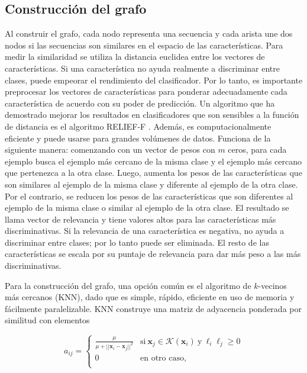 \subsection{Construcción del grafo}

Al construir el grafo, cada nodo representa una secuencia y cada arista une dos nodos si las secuencias son similares en el espacio de las características. Para
medir la similaridad se utiliza la distancia euclidea entre los vectores de características. Si una característica no ayuda realmente a discriminar entre
clases, puede empeorar el rendimiento del clasificador. Por lo tanto, es importante preprocesar los vectores de características para ponderar adecuadamente cada
característica de acuerdo con su poder de predicción. Un algoritmo que ha demostrado mejorar los resultados en clasificadores que son sensibles a la función de
distancia es el algoritmo RELIEF-F \citep{kononenko1994estimating, wettschereck1997review}. Además, es computacionalmente eficiente y puede usarse para grandes
volúmenes de datos. Funciona de la siguiente manera: comenzando con un vector de pesos con $m$ ceros, para cada ejemplo busca el ejemplo más cercano de la misma
clase y el ejemplo más cercano que pertenezca a la otra clase. Luego, aumenta los pesos de las características que son similares al ejemplo de la misma clase y
diferente al ejemplo de la otra clase. Por el contrario, se reducen los pesos de las características que son diferentes al ejemplo de la misma clase o similar
al ejemplo de la otra clase. El resultado se llama vector de relevancia y tiene valores altos para las características más discriminativas. Si la relevancia
de una característica es negativa, no ayuda a discriminar entre clases; por lo tanto puede ser eliminada. El resto de las características se escala por su
puntaje de relevancia para dar más peso a las más discriminativas.

Para la construcción del grafo, una opción común es el algoritmo de $k$-vecinos más cercanos (KNN), dado que es simple, rápido, eficiente en uso de
memoria y fácilmente paralelizable. KNN construye una matriz de adyacencia ponderada por similitud con elementos

\begin{equation}
	a_{ij} =
	\begin{cases}
		\frac{\mu}{\mu + ||\mathbf{x}_{i} - \mathbf{x}_{j}||^2} & \text{si} \ \mathbf{x}_{j} \in  \mathcal{K}(\mathbf{x}_{i}) \ \text{y} \ \ell_{i}
		\ell_{j} \geq 0 \\
		0 & \text{en otro caso,} \\
	\end{cases}
\end{equation}

